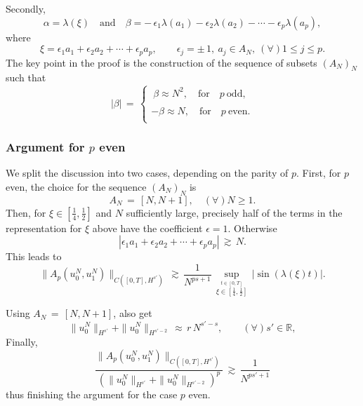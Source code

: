 \documentclass{beamer}
\numberwithin{equation}{section}
\begin{document}
\begin{frame}
Secondly, 
\begin{equation*}
\alpha=\lambda(\xi) \quad \text{and} \quad \beta= -\,\epsilon_1\lambda(a_1)-\epsilon_2\lambda(a_2)-\cdots-\epsilon_p\lambda(a_p),
\label{ab}
\end{equation*}
where
\begin{equation*}
\xi=  \epsilon_1 a_1+\epsilon_2 a_2+ \cdots+\epsilon_p a_p, \qquad \epsilon_j=\pm \,1, \ a_j\in A_N, \ (\forall)1\leq j\leq p.\label{xi}
\end{equation*}
\pause
The key point in the proof is the construction of the sequence of subsets $(A_N)_N$ such that
\begin{equation*}
 |\beta|\,=\, \left\{
\begin{array}{l}
\ \beta \approx N^{2}, \quad \text{for} \quad p \ \text{odd},\\
\\
-\beta \approx N, \quad \text{for} \quad p \ \text{even}.\\
\end{array}\right.
\end{equation*}
\end{frame}
\begin{frame}
\frametitle{Argument for $p$ even} 
We split the discussion into two cases, depending on the parity of $p$. First, for $p$ even, the choice for the sequence $(A_N)_N$ is 
\[
A_N\,=\,[N,N+1], \quad (\forall) N \geq 1.
\]
\pause
Then, for $\xi \in \left[\frac{1}{4},\frac{1}{2}\right]$ and $N$ sufficiently large, precisely half of the terms in the representation for $\xi$ above have the coefficient $\epsilon =1$. Otherwise
\[
\left|\epsilon_1 a_1+\epsilon_2 a_2+ \cdots+\epsilon_p a_p\right|\,\gtrsim\,N.\]
This leads to
\pause
\begin{equation*}
\|A_{p}(u_0^N,u_1^N)\|_{C([0,T], H^{s'})}\,\gtrsim\,  \frac{1}{N^{ps+1}}\,\sup_{\stackrel{t \in [0,T]}{\xi \in \left[\frac{1}{4},\frac{1}{2}\right]}} \,|\sin(\lambda(\xi)t)|.
\label{aphs2}
\end{equation*} 
\end{frame}
\begin{frame}
Using $A_N\,=\,[N,N+1]$, also get
\begin{equation*}
 \|u_0^N\|_{H^{s'}} + \|u_0^N\|_ {H^{{s'}-2}}\,\approx\, r\,N^{s'-s},\qquad (\forall) s'\in \mathbb{R},
\label{idhs} 
\end{equation*}
\pause
Finally,  
\begin{equation*}
\frac{\|A_{p}(u_0^N,u_1^N)\|_{C([0,T],H^{s'})}}{(\|u_0^N\|_{H^{s'}} + \|u_0^N\|_ {H^{{s'}-2}})^{p}}\,\gtrsim\, \frac{1}{N^{ps' +1}}\end{equation*}
thus finishing the argument for the case $p$ even.
\end{frame}
\end{document}
